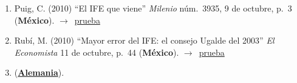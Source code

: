 \documentclass[12 pt, letter]{article}
\newenvironment{CitasMiTrabajo}{
    \begin{footnotesize}
    \begin{enumerate}[label={\footnotesize\emph{cita~\arabic*}},ref=\arabic*] %
        \setlength{\itemsep}{.1\itemsep}
        \setlength{\parskip}{.1\parskip}
    }{\end{enumerate}\end{footnotesize}}
\begin{document}
        \begin{CitasMiTrabajo}

        \item Puig, C. (2010)
        ``El
        IFE que viene'' \emph{Milenio} n\'um.\ 3935, 9 de octubre, p.~3 (\textbf{M\'exico}). $\rightarrow$~\href{http://ericmagar.com/cv/cites/magarEtalIFEDinam/puig.pdf}{prueba}

        \item Rub\'i, M. (2010)
        ``Mayor error del IFE: el consejo Ugalde del 2003'' \emph{El Economista} 11 de octubre, p.~44 (\textbf{M\'exico}). $\rightarrow$~\href{http://ericmagar.com/cv/cites/magarEtalIFEDinam/rubi.pdf}{prueba}

        \item {} (\href{http://ericmagar.com/cv/cites/magarEtalIFEDinam/lara2015.pdf}{\textbf{Alemania}}).

          
        \label{ncites:magar.estevez.rosas.2010} %

        \end{CitasMiTrabajo}












\end{document}

